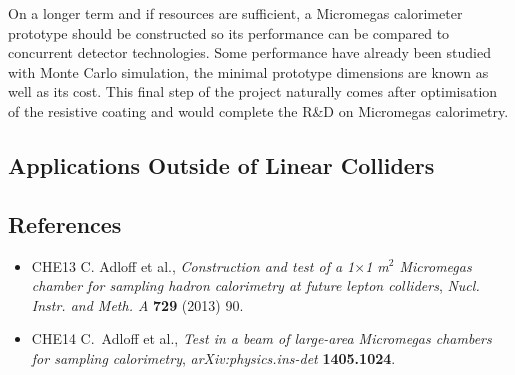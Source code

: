 On a longer term and if resources are sufficient, a Micromegas calorimeter prototype should be constructed so its performance can be compared to concurrent detector technologies. Some performance have already been studied with Monte Carlo simulation, the minimal prototype dimensions are known as well as its cost. This final step of the project naturally comes after optimisation of the resistive coating and would complete the R\&D on Micromegas calorimetry.

\subsection{Applications Outside of Linear Colliders}

\subsection{References}
\begin{itemize}
\item{CHE13}
  C. Adloff et al.,
  \emph{Construction and test of a 1$\times$1 m$^{2}$ Micromegas chamber for sampling hadron calorimetry at future lepton colliders},
  \emph{Nucl. Instr. and Meth. A} \textbf{729} (2013) 90.

\item{CHE14}
  C.~Adloff et al.,
  \emph{Test in a beam of large-area Micromegas chambers for sampling calorimetry},
  \emph{arXiv:physics.ins-det} \textbf{1405.1024}.

\end{itemize}